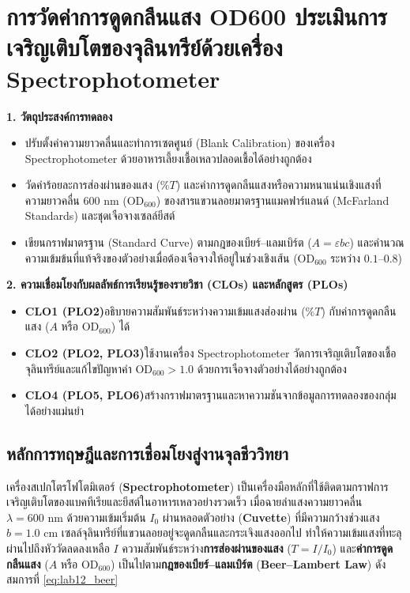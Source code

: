 \chapter{การวัดค่าการดูดกลืนแสง OD600 ประเมินการเจริญเติบโตของจุลินทรีย์ด้วยเครื่อง Spectrophotometer}

\begin{planbox}
\textbf{1. วัตถุประสงค์การทดลอง}
\begin{itemize}
    \item ปรับตั้งค่าความยาวคลื่นและทำการเซตศูนย์ (Blank Calibration) ของเครื่อง Spectrophotometer ด้วยอาหารเลี้ยงเชื้อเหลวปลอดเชื้อได้อย่างถูกต้อง
    \item วัดค่าร้อยละการส่องผ่านของแสง ($\%T$) และค่าการดูดกลืนแสงหรือความหนาแน่นเชิงแสงที่ความยาวคลื่น $600\text{ nm}$ ($\text{OD}_{600}$) ของสารแขวนลอยมาตรฐานแมคฟาร์แลนด์ (McFarland Standards) และชุดเจือจางเซลล์ยีสต์
    \item เขียนกราฟมาตรฐาน (Standard Curve) ตามกฎของเบียร์--แลมเบิร์ต ($A = \varepsilon b c$) และคำนวณความเข้มข้นที่แท้จริงของตัวอย่างเมื่อต้องเจือจางให้อยู่ในช่วงเชิงเส้น ($\text{OD}_{600}$ ระหว่าง $0.1\text{--}0.8$)
\end{itemize}
\textbf{2. ความเชื่อมโยงกับผลลัพธ์การเรียนรู้ของรายวิชา (CLOs) และหลักสูตร (PLOs)}
\begin{itemize}
    \item \textbf{CLO1 (PLO2)}\quad อธิบายความสัมพันธ์ระหว่างความเข้มแสงส่องผ่าน ($\%T$) กับค่าการดูดกลืนแสง ($A$ หรือ $\text{OD}_{600}$) ได้
    \item \textbf{CLO2 (PLO2, PLO3)}\quad ใช้งานเครื่อง Spectrophotometer วัดการเจริญเติบโตของเชื้อจุลินทรีย์และแก้ไขปัญหาค่า $\text{OD}_{600} > 1.0$ ด้วยการเจือจางตัวอย่างได้อย่างถูกต้อง
    \item \textbf{CLO4 (PLO5, PLO6)}\quad สร้างกราฟมาตรฐานและหาความชันจากข้อมูลการทดลองของกลุ่มได้อย่างแม่นยำ
\end{itemize}
\end{planbox}

\section{หลักการทฤษฎีและการเชื่อมโยงสู่งานจุลชีววิทยา}

เครื่องสเปกโตรโฟโตมิเตอร์ (\textbf{Spectrophotometer}) เป็นเครื่องมือหลักที่ใช้ติดตามกราฟการเจริญเติบโตของแบคทีเรียและยีสต์ในอาหารเหลวอย่างรวดเร็ว เมื่อฉายลำแสงความยาวคลื่น $\lambda = 600\text{ nm}$ ด้วยความเข้มเริ่มต้น $I_0$ ผ่านหลอดตัวอย่าง (\textbf{Cuvette}) ที่มีความกว้างช่วงแสง $b = 1.0\text{ cm}$ เซลล์จุลินทรีย์ที่แขวนลอยอยู่จะดูดกลืนและกระเจิงแสงออกไป ทำให้ความเข้มแสงที่ทะลุผ่านไปถึงหัววัดลดลงเหลือ $I$ ความสัมพันธ์ระหว่าง\textbf{การส่องผ่านของแสง} ($T = I/I_0$) และ\textbf{ค่าการดูดกลืนแสง} ($A$ หรือ $\text{OD}_{600}$) เป็นไปตาม\textbf{กฎของเบียร์--แลมเบิร์ต} (\textbf{Beer--Lambert Law}) ดังสมการที่ \eqref{eq:lab12_beer}

